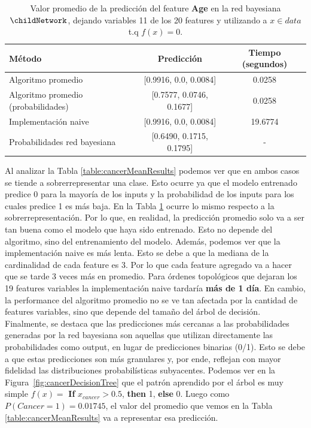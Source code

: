 \begin{table}[ht]
	\centering
	\begin{tabular}{l c c}
		\toprule
		\textbf{M\'etodo} & \textbf{Predicci\'on} & \textbf{Tiempo (segundos)} \\
		\midrule
		Algoritmo promedio & [0.9916, 0.0, 0.0084] & 0.0258 \\
		Algoritmo promedio (probabilidades) & [0.7577, 0.0746, 0.1677] & 0.0258 \\
		Implementaci\'on naive & [0.9916, 0.0, 0.0084] & 19.6774 \\
		Probabilidades red bayesiana & [0.6490, 0.1715, 0.1795] & - \\
		\bottomrule
	\end{tabular}
	\caption{Valor promedio de la predicci\'on del feature \textbf{Age} en la red bayesiana $\childNetwork$, dejando variables 11 de los 20 features y utilizando a $x\in data$ t.q $f(x)=0$.}
	\label{table:childMeanResults}
\end{table}

Al analizar la Tabla \ref{table:cancerMeanResults} podemos ver que en ambos casos se tiende a sobrerrepresentar una clase. Esto ocurre ya que el modelo entrenado predice 0 para la mayoría de los inputs y la probabilidad de los inputs para los cuales predice 1 es más baja. En la Tabla \ref{table:childMeanResults} ocurre lo mismo respecto a la sobrerrepresentación. Por lo que, en realidad, la predicción promedio solo va a ser tan buena como el modelo que haya sido entrenado. Esto no depende del algoritmo, sino del entrenamiento del modelo.
Además, podemos ver que la implementación naive es más lenta. Esto se debe a que la mediana de la cardinalidad de cada feature es 3. Por lo que cada feature agregado va a hacer que se tarde 3 veces más en promedio. Para órdenes topológicos que dejaran los 19 features variables la implementación naive tardaría \textbf{más de 1 día}. En cambio, la performance del algoritmo promedio no se ve tan afectada por la cantidad de features variables, sino que depende del tamaño del árbol de decisión. Finalmente, se destaca que las predicciones más cercanas a las probabilidades generadas por la red bayesiana son aquellas que utilizan directamente las probabilidades como output, en lugar de predicciones binarias (0/1). Esto se debe a que estas predicciones son más granulares y, por ende, reflejan con mayor fidelidad las distribuciones probabilísticas subyacentes. Podemos ver en la Figura~\ref{fig:cancerDecisionTree} que el patrón aprendido por el árbol es muy simple $f(x) = $ \textbf{If} $x_{cancer} > 0.5$, \textbf{then} 1, \textbf{else} 0. Luego como $P(Cancer = 1) = 0.01745$, el valor del promedio que vemos en la Tabla \ref{table:cancerMeanResults} va a representar esa predicción. 

